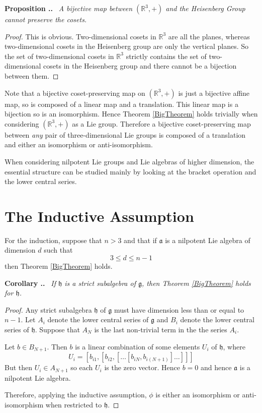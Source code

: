 \documentclass[honours]{UNSWthesis}
\newcommand{\R}{\mathbb{R}}
\newcommand{\g}{\mathfrak{g}}
\newcommand{\1}{\mathbf{e}_{1}}
\newcommand{\2}{\mathbf{e}_{3}}
\newcommand{\3}{\mathbf{e}_{3}}
\newcounter{Item}[section]
\newenvironment{Proposition}{\medskip
                            \refstepcounter{Item}
                            \noindent
                           {\bf Proposition \thesection.\theItem.}\ %
                            \begingroup \sl}
                           {\endgroup\medskip}
\newenvironment{Corollary}{\medskip
                            \refstepcounter{Item}
                            \noindent
                           {\bf Corollary \thesection.\theItem.}\ %
                            \begingroup \sl}
                           {\endgroup\medskip}
\begin{document}
\begin{Proposition}
A bijective map between $(\R^{3},+)$ and the Heisenberg Group cannot preserve the cosets.
\end{Proposition}

\begin{proof}
This is obvious. Two-dimensional cosets in $\R^{3}$ are all the planes, whereas two-dimensional cosets in the Heisenberg group are only the vertical planes. So the set of two-dimensional cosets in $\R^{3}$ strictly contains the set of two-dimensional cosets in the Heisenberg group and there cannot be a bijection between them.
\end{proof}

Note that a bijective coset-preserving map on $(\R^{3},+)$ is just a bijective affine map, so is composed of a linear map and a translation. This linear map is a bijection so is an isomorphism. Hence Theorem \ref{BigTheorem} holds trivially when considering $(\R^{3},+)$ as a Lie group.
Therefore a bijective coset-preserving map between \emph{any} pair of three-dimensional Lie groups is composed of a translation and either an isomorphism or anti-isomorphism.


When considering nilpotent Lie groups and Lie algebras of higher dimension, the essential structure can be studied mainly by looking at the bracket operation and the lower central series.




\section{The Inductive Assumption}
For the induction, suppose that $n > 3$ and that if $\mathfrak{a}$ is a nilpotent Lie algebra of dimension $d$ such that
\[
3 \leq d \leq n-1
\]
then Theorem \ref{BigTheorem} holds. 

\begin{Corollary}\label{CorReduceDim}
If $\mathfrak{h}$ is a strict subalgebra of $\g$, then Theorem \ref{BigTheorem} holds for $\mathfrak{h}$. 
\end{Corollary}

\begin{proof}
Any strict subalgebra $\mathfrak{h}$ of $\g$ must have dimension less than or equal to $n-1$. Let $A_{i}$ denote the lower central series of $\g$ and $B_{i}$ denote the lower central series of $\mathfrak{h}$. Suppose that $A_{N}$ is the last non-trivial term in the the series $A_{i}$. 

Let $b \in B_{N+1}$. Then $b$ is a linear combination of some elements $U_{i}$ of $\mathfrak{h}$, where 
\[
U_{i}=[b_{i1},[b_{i2},[\ldots[b_{iN}, b_{i(N+1)}]\ldots]]]
\]
But then $U_{i} \in A_{N+1}$ so each $U_{i}$ is the zero vector. Hence $b=0$ and hence $\mathfrak{a}$ is a nilpotent Lie algebra. 

Therefore, applying the inductive assumption, $\phi$ is either an isomorphism or anti-isomorphism when restricted to $\mathfrak{h}$.
  
\end{proof}
\end{document}
